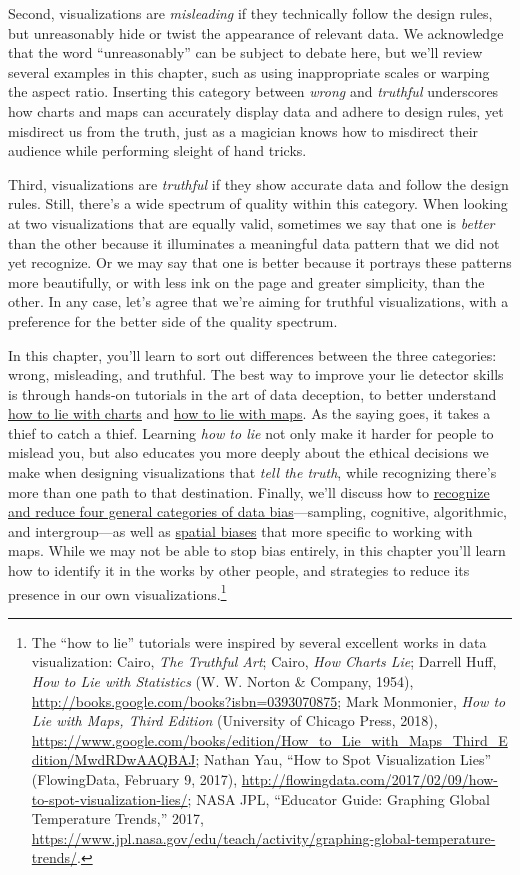 \documentclass[
  english,
]{book}
\begin{document}
Second, visualizations are \emph{misleading} if they technically follow the design rules, but unreasonably hide or twist the appearance of relevant data. We acknowledge that the word ``unreasonably'' can be subject to debate here, but we'll review several examples in this chapter, such as using inappropriate scales or warping the aspect ratio. Inserting this category between \emph{wrong} and \emph{truthful} underscores how charts and maps can accurately display data and adhere to design rules, yet misdirect us from the truth, just as a magician knows how to misdirect their audience while performing sleight of hand tricks.

Third, visualizations are \emph{truthful} if they show accurate data and follow the design rules. Still, there's a wide spectrum of quality within this category. When looking at two visualizations that are equally valid, sometimes we say that one is \emph{better} than the other because it illuminates a meaningful data pattern that we did not yet recognize. Or we may say that one is better because it portrays these patterns more beautifully, or with less ink on the page and greater simplicity, than the other. In any case, let's agree that we're aiming for truthful visualizations, with a preference for the better side of the quality spectrum.

In this chapter, you'll learn to sort out differences between the three categories: wrong, misleading, and truthful. The best way to improve your lie detector skills is through hands-on tutorials in the art of data deception, to better understand \href{how-to-lie-with-charts.html}{how to lie with charts} and \href{how-to-lie-with-maps.html}{how to lie with maps}. As the saying goes, it takes a thief to catch a thief. Learning \emph{how to lie} not only make it harder for people to mislead you, but also educates you more deeply about the ethical decisions we make when designing visualizations that \emph{tell the truth}, while recognizing there's more than one path to that destination. Finally, we'll discuss how to \href{data-bias.html}{recognize and reduce four general categories of data bias}---sampling, cognitive, algorithmic, and intergroup---as well as \href{spatial-bias.html}{spatial biases} that more specific to working with maps. While we may not be able to stop bias entirely, in this chapter you'll learn how to identify it in the works by other people, and strategies to reduce its presence in our own visualizations.\footnote{The ``how to lie'' tutorials were inspired by several excellent works in data visualization: Cairo, \emph{The {Truthful Art}}; Cairo, \emph{How {Charts Lie}}; Darrell Huff, \emph{How to {Lie} with {Statistics}} ({W. W. Norton \& Company}, 1954), \url{http://books.google.com/books?isbn=0393070875}; Mark Monmonier, \emph{How to {Lie} with {Maps}, {Third Edition}} ({University of Chicago Press}, 2018), \url{https://www.google.com/books/edition/How_to_Lie_with_Maps_Third_Edition/MwdRDwAAQBAJ}; Nathan Yau, {``How to {Spot Visualization Lies}''} ({FlowingData}, February 9, 2017), \url{http://flowingdata.com/2017/02/09/how-to-spot-visualization-lies/}; NASA JPL, {``Educator {Guide}: {Graphing Global Temperature Trends},''} 2017, \url{https://www.jpl.nasa.gov/edu/teach/activity/graphing-global-temperature-trends/}.}
\end{document}
